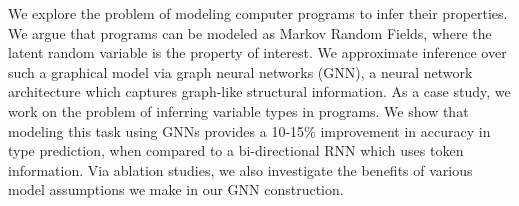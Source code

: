 We explore the problem of modeling computer programs to infer their properties.
We argue that programs can be modeled as Markov Random Fields, where the latent random variable is the property of interest.
We approximate inference over such a graphical model via graph neural networks (GNN), a neural network architecture which captures graph-like structural information.
As a case study, we work on the problem of inferring variable types in programs.
We show that modeling this task using GNNs provides a 10-15\% improvement in accuracy in type prediction, when compared to a bi-directional RNN which uses token information.
Via ablation studies, we also investigate the benefits of various model assumptions we make in our GNN construction.